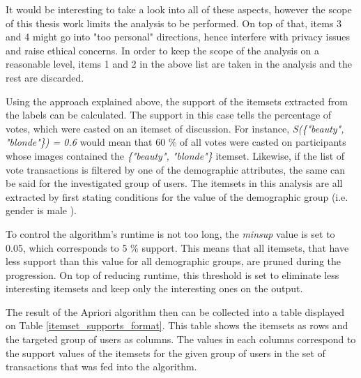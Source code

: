     It would be interesting to take a look into all of these aspects, however the scope of this thesis work limits the analysis to be performed. On top of that, items 3 and 4 might go into "too personal" directions, hence interfere with privacy issues and raise ethical concerns. In order to keep the scope of the analysis on a reasonable level, items 1 and 2 in the above list are taken in the analysis and the rest are discarded. 
    
    Using the approach explained above, the support of the itemsets extracted from the labels can be calculated. The support in this case tells the percentage of votes, which were casted on an itemset of discussion. For instance, \emph{S(\{"beauty", "blonde"\}) = 0.6} would mean that 60 \% of all votes were casted on participants whose images contained the \emph{\{"beauty", "blonde"\}} itemset. Likewise, if the list of vote transactions is filtered by one of the demographic attributes, the same can be said for the investigated group of users. The itemsets in this analysis are all extracted by first stating conditions for the value of the demographic group (i.e. gender is male    ).

    To control the algorithm's runtime is not too long, the \emph{minsup} value is set to 0.05, which corresponds to 5 \% support. This means that all itemsets, that have less support than this value for all demographic groups, are pruned during the progression. On top of reducing runtime, this threshold is set to eliminate less interesting itemsets and keep only the interesting ones on the output.

    The result of the Apriori algorithm then can be collected into a table displayed on Table \ref{itemset_supports_format}. This table shows the itemsets as rows and the targeted group of users as columns. The values in each columns correspond to the support values of the itemsets for the given group of users in the set of transactions that was fed into the algorithm. 


